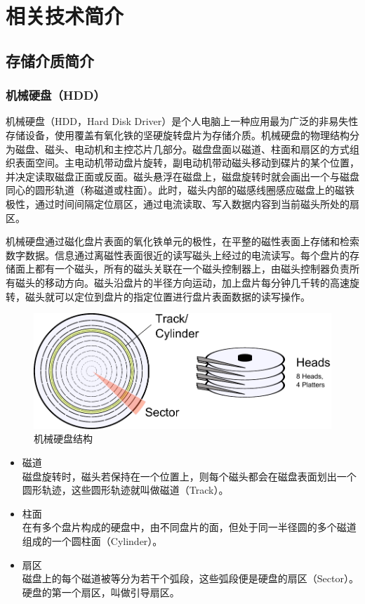 
\chapter{相关技术简介}
\label{cha:related_work}

\section{存储介质简介}

\subsection{机械硬盘（HDD）}
机械硬盘\cite{hdd2009}（HDD，Hard Disk Driver）是个人电脑上一种应用最为广泛的非易失性存储设备，使用覆盖有氧化铁的坚硬旋转盘片为存储介质。机械硬盘的物理结构分为磁盘、磁头、电动机和主控芯片几部分。磁盘盘面以磁道、柱面和扇区的方式组织表面空间。主电动机带动盘片旋转，副电动机带动磁头移动到碟片的某个位置，并决定读取磁盘正面或反面。磁头悬浮在磁盘上，磁盘旋转时就会画出一个与磁盘同心的圆形轨道（称磁道或柱面）。此时，磁头内部的磁感线圈感应磁盘上的磁铁极性，通过时间间隔定位扇区，通过电流读取、写入数据内容到当前磁头所处的扇区。

机械硬盘通过磁化盘片表面的氧化铁单元的极性，在平整的磁性表面上存储和检索数字数据。信息通过离磁性表面很近的读写磁头上经过的电流读写。每个盘片的存储面上都有一个磁头，所有的磁头关联在一个磁头控制器上，由磁头控制器负责所有磁头的移动方向。磁头沿盘片的半径方向运动，加上盘片每分钟几千转的高速旋转，磁头就可以定位到盘片的指定位置进行盘片表面数据的读写操作。

\begin{figure}[H]
\centering
\includegraphics[width=0.6\linewidth]{./graph/hdd-struct}
\caption{机械硬盘结构}
\label{fig:hdd-struct}
\end{figure}

\begin{itemize}
\item 磁道
\\磁盘旋转时，磁头若保持在一个位置上，则每个磁头都会在磁盘表面划出一个圆形轨迹，这些圆形轨迹就叫做磁道（Track）。
\item 柱面
\\在有多个盘片构成的硬盘中，由不同盘片的面，但处于同一半径圆的多个磁道组成的一个圆柱面（Cylinder）。
\item 扇区
\\磁盘上的每个磁道被等分为若干个弧段，这些弧段便是硬盘的扇区（Sector）。硬盘的第一个扇区，叫做引导扇区。
\end{itemize}

